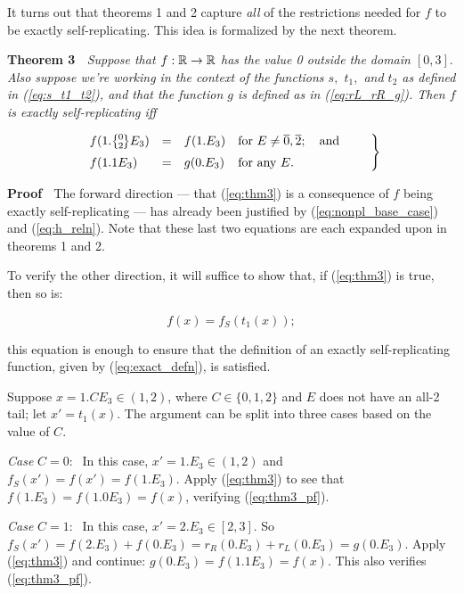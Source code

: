 \documentclass[20pt,]{extarticle}
\newcommand{\latexonlyrule}{\rule}
\begin{document}
It turns out that theorems 1 and 2 capture \emph{all} of the
restrictions needed for \(f\) to be exactly self-replicating. This idea
is formalized by the next theorem.

\textbf{Theorem 3} \(\;\) \emph{Suppose that \(f:\mathbb{R}\to\mathbb{R}\) has the value
0 outside the domain \([0, 3].\) Also suppose we're working in the
context of the functions \(s,\) \(t_1,\) and \(t_2\) as defined in
(\ref{eq:s_t1_t2}), and that the function \(g\) is defined as in
(\ref{eq:rL_rR_g}). Then \(f\) is exactly self-replicating iff}

\begin{equation}\eqnset{\begin{array}{lcll}
f(1.\zerotwo E_3) & = & f(1.E_3) & \text{for } E\ne\overline 0,\overline 2;
  \quad\text{and} \\
f(1.1E_3)         & = & g(0.E_3) & \text{for any }E. \latexonlyrule{0pt}{14pt} \\
\end{array}}\label{eq:thm3}\end{equation}

\textbf{Proof} \(\;\) The forward direction --- that (\ref{eq:thm3}) is
a consequence of \(f\) being exactly self-replicating --- has already
been justified by (\ref{eq:nonpl_base_case}) and (\ref{eq:h_reln}). Note
that these last two equations are each expanded upon in theorems 1 and
2.

To verify the other direction, it will suffice to show that, if
(\ref{eq:thm3}) is true, then so is:

\begin{equation}f(x) = f_S(t_1(x));\label{eq:thm3_pf}\end{equation}

this equation is enough to ensure that the definition of an exactly
self-replicating function, given by (\ref{eq:exact_defn}), is satisfied.

Suppose \(x=1.CE_3 \in (1,2)\), where \(C \in \{0, 1, 2\}\) and \(E\)
does not have an all-2 tail; let \(x' = t_1(x)\). The argument can be
split into three cases based on the value of \(C\).

\emph{Case} \(C=0:\;\) In this case, \(x' = 1.E_3 \in (1, 2)\) and
\(f_S(x') = f(x') = f(1.E_3).\) Apply (\ref{eq:thm3}) to see that
\(f(1.E_3) = f(1.0E_3) = f(x)\), verifying (\ref{eq:thm3_pf}).

\emph{Case} \(C=1:\;\) In this case, \(x' = 2.E_3 \in [2,3].\) So
\(f_S(x') = f(2.E_3) + f(0.E_3) = r_R(0.E_3) + r_L(0.E_3) = g(0.E_3).\)
Apply (\ref{eq:thm3}) and continue: \(g(0.E_3) = f(1.1E_3) = f(x).\)
This also verifies (\ref{eq:thm3_pf}).
\end{document}
